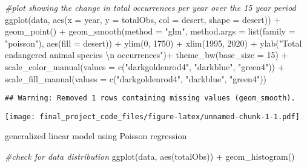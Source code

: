 \documentclass[
]{article}
\newenvironment{Shaded}{\begin{snugshade}}{\end{snugshade}}
\newcommand{\AttributeTok}[1]{\textcolor[rgb]{0.77,0.63,0.00}{#1}}
\newcommand{\CommentTok}[1]{\textcolor[rgb]{0.56,0.35,0.01}{\textit{#1}}}
\newcommand{\DecValTok}[1]{\textcolor[rgb]{0.00,0.00,0.81}{#1}}
\newcommand{\FunctionTok}[1]{\textcolor[rgb]{0.00,0.00,0.00}{#1}}
\newcommand{\NormalTok}[1]{#1}
\newcommand{\SpecialCharTok}[1]{\textcolor[rgb]{0.00,0.00,0.00}{#1}}
\newcommand{\StringTok}[1]{\textcolor[rgb]{0.31,0.60,0.02}{#1}}
\begin{document}
\begin{Shaded}
\begin{Highlighting}[]
\CommentTok{\#plot showing the change in total occurrences per year over the 15 year period}
\FunctionTok{ggplot}\NormalTok{(data, }\FunctionTok{aes}\NormalTok{(}\AttributeTok{x =}\NormalTok{ year, }\AttributeTok{y =}\NormalTok{ totalObs, }\AttributeTok{col =}\NormalTok{ desert, }\AttributeTok{shape =}\NormalTok{ desert)) }\SpecialCharTok{+}
  \FunctionTok{geom\_point}\NormalTok{() }\SpecialCharTok{+}
  \FunctionTok{geom\_smooth}\NormalTok{(}\AttributeTok{method =} \StringTok{"glm"}\NormalTok{, }\AttributeTok{method.args =} \FunctionTok{list}\NormalTok{(}\AttributeTok{family =} \StringTok{"poisson"}\NormalTok{), }\FunctionTok{aes}\NormalTok{(}\AttributeTok{fill =}\NormalTok{ desert)) }\SpecialCharTok{+}
  \FunctionTok{ylim}\NormalTok{(}\DecValTok{0}\NormalTok{, }\DecValTok{1750}\NormalTok{) }\SpecialCharTok{+}
  \FunctionTok{xlim}\NormalTok{(}\DecValTok{1995}\NormalTok{, }\DecValTok{2020}\NormalTok{) }\SpecialCharTok{+}
  \FunctionTok{ylab}\NormalTok{(}\StringTok{"Total endangered animal species }\SpecialCharTok{\textbackslash{}n}\StringTok{ occurrences"}\NormalTok{)}\SpecialCharTok{+}
  \FunctionTok{theme\_bw}\NormalTok{(}\AttributeTok{base\_size =} \DecValTok{15}\NormalTok{) }\SpecialCharTok{+}
  \FunctionTok{scale\_color\_manual}\NormalTok{(}\AttributeTok{values =} \FunctionTok{c}\NormalTok{(}\StringTok{"darkgoldenrod4"}\NormalTok{, }\StringTok{"darkblue"}\NormalTok{, }\StringTok{"green4"}\NormalTok{)) }\SpecialCharTok{+}
  \FunctionTok{scale\_fill\_manual}\NormalTok{(}\AttributeTok{values =} \FunctionTok{c}\NormalTok{(}\StringTok{"darkgoldenrod4"}\NormalTok{, }\StringTok{"darkblue"}\NormalTok{, }\StringTok{"green4"}\NormalTok{))}
\end{Highlighting}
\end{Shaded}

\begin{verbatim}
## Warning: Removed 1 rows containing missing values (geom_smooth).
\end{verbatim}

\texttt{[image: final\_project\_code\_files/figure-latex/unnamed-chunk-1-1.pdf]}

generalized linear model using Poisson regression

\begin{Shaded}
\begin{Highlighting}[]
\CommentTok{\#check for data distribution}
\FunctionTok{ggplot}\NormalTok{(data, }\FunctionTok{aes}\NormalTok{(totalObs)) }\SpecialCharTok{+}
  \FunctionTok{geom\_histogram}\NormalTok{()}
\end{Highlighting}
\end{Shaded}
\end{document}
